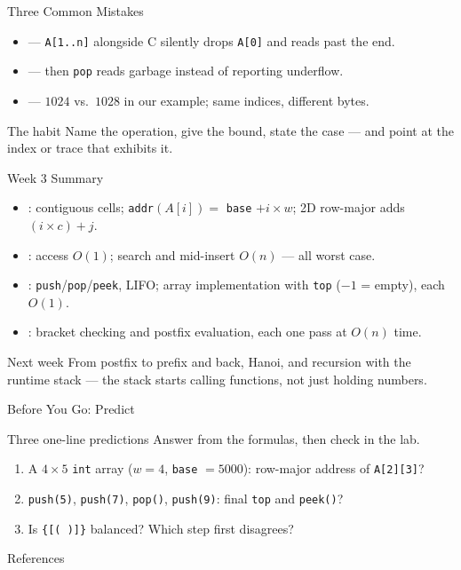 \documentclass[aspectratio=169]{beamer}
\begin{document}
\begin{frame}{Three Common Mistakes}
  \begin{itemize}
    \item {} --- \texttt{A[1..n]} alongside
      C silently drops \texttt{A[0]} and reads past the end.
    \item {} --- then \texttt{pop}
      reads garbage instead of reporting underflow.
    \item {} --- $1024$ vs.\ $1028$ in our
      example; same indices, different bytes.
  \end{itemize}
  \begin{exampleblock}{The habit}
    Name the operation, give the bound, state the case --- and point at the
    index or trace that exhibits it.
  \end{exampleblock}
\end{frame}

\begin{frame}{Week 3 Summary}
  \begin{itemize}
    \item {}: contiguous cells; \texttt{addr}$(A[i]) = $ \texttt{base}
      $+ i \times w$; 2D row-major adds $(i \times c) + j$.
    \item {}: access $O(1)$; search and mid-insert $O(n)$ --- all
      worst case.
    \item {}: \texttt{push}/\texttt{pop}/\texttt{peek}, LIFO;
      array implementation with \texttt{top} ($-1$ = empty), each $O(1)$.
    \item {}: bracket checking and postfix evaluation, each
      one pass at $O(n)$ time.
  \end{itemize}
  \begin{exampleblock}{Next week}
    From postfix to prefix and back, Hanoi, and recursion with the runtime
    stack --- the stack starts calling functions, not just holding numbers.
  \end{exampleblock}
\end{frame}

\begin{frame}{Before You Go: Predict}
  \begin{block}{Three one-line predictions}
    Answer from the formulas, then check in the lab.
  \end{block}
  \begin{enumerate}
    \item A $4 \times 5$ \texttt{int} array ($w = 4$, \texttt{base} $= 5000$):
      row-major address of \texttt{A[2][3]}?
    \item \texttt{push(5)}, \texttt{push(7)}, \texttt{pop()},
      \texttt{push(9)}: final \texttt{top} and \texttt{peek()}?
    \item Is \texttt{\{[( )]\}} balanced? Which step first disagrees?
  \end{enumerate}
  \muted{Answers: $5052$; \texttt{top} $= 1$, \texttt{peek()} $= 9$; no ---
    the \texttt{(} meets \texttt{]}.}
\end{frame}

\begin{frame}[allowframebreaks]{References}
  \footnotesize
  
  
\end{frame}
\end{document}

